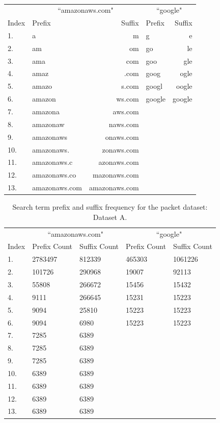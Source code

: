 \documentclass{article}
\begin{document}
\begin{table}[h!bt]
  \centering
  \begin{tabular}{l|l|r||l|r}
    & \multicolumn{2}{c}{``amazonaws.com"} & \multicolumn{2}{c}{``google"} \\
    Index & Prefix & Suffix & Prefix & Suffix \\
    \hline
    1. & a  & m  & g  & e \\
    2. & am  & om  & go  & le \\
    3. & ama  & com  & goo  & gle \\
    4. & amaz  & .com  & goog  & ogle \\
    5. & amazo  & s.com  & googl  & oogle \\
    6. & amazon  & ws.com  & google  & google \\
    7. & amazona  & aws.com  &  & \\
    8. & amazonaw  & naws.com  &  & \\
    9. & amazonaws  & onaws.com  &  & \\
    10. & amazonaws.  & zonaws.com  &  & \\
    11. & amazonaws.c  & azonaws.com  &  & \\
    12. & amazonaws.co  & mazonaws.com  &  & \\
    13. & amazonaws.com  & amazonaws.com  &  & 
  \end{tabular}
  \caption{}
\end{table}

\begin{table}[h!bt]
  \centering
  \begin{tabular}{l|l|l||l|l}
    & \multicolumn{2}{c}{``amazonaws.com"} & \multicolumn{2}{c}{``google"} \\
    Index & Prefix Count & Suffix Count & Prefix Count & Suffix Count \\
    \hline
    1. & 2783497 & 812339 & 465303 & 1061226\\
    2. & 101726 & 290968 & 19007 & 92113\\
    3. & 55808 & 266672 & 15456 & 15432\\
    4. & 9111 & 266645 & 15231 & 15223\\
    5. & 9094 & 25810 & 15223 & 15223\\
    6. & 9094 & 6980 & 15223 & 15223\\
    7. & 7285 & 6389 & &\\
    8. & 7285 & 6389 & &\\
    9. & 7285 & 6389 & &\\
    10. & 6389 & 6389 & &\\
    11. & 6389 & 6389 & &\\
    12. & 6389 & 6389 & &\\
    13. & 6389 & 6389 & &
  \end{tabular}
  \caption{Search term prefix and suffix frequency for the packet dataset: Dataset A.}
  \label{table:packets-prefix-suffix-frequency}
\end{table}
\end{document}
